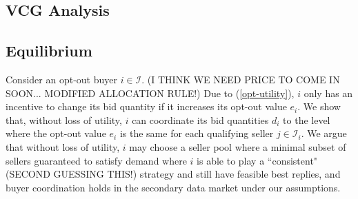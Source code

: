 \documentclass[12pt]{article}
\theoremstyle{definition}
\newcommand{\mcI}{\mathcal{I}}
\begin{document}
\begin{multicols}{2}
\section{VCG Analysis}
\subsection{Equilibrium}

Consider an opt-out buyer $i\in\mcI$. 
(I THINK WE NEED PRICE TO COME IN SOON... MODIFIED ALLOCATION RULE!)
Due to (\ref{opt-utility}), $i$ only has an incentive to change its bid
quantity if it increases its opt-out value $e_i$. 
We show that, without loss of utility, $i$ can coordinate its
bid quantities $d_i$ to the level where the opt-out value $e_i$ 
 is the same for each qualifying seller $j \in\mcI_i$. We argue
that without loss of utility, $i$ may choose a seller pool where a minimal subset
of sellers guaranteed to satisfy demand where $i$ is able to play a
``consistent" (SECOND GUESSING THIS!)
strategy and still have feasible best replies, and buyer
coordination holds in the secondary data market under our assumptions.


\end{multicols}
\end{document}
